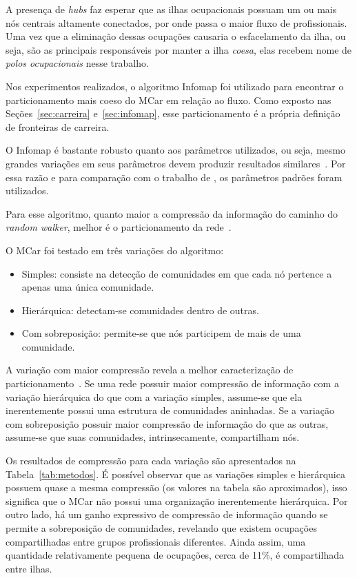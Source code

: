 \documentclass[
  article,
  11pt,
  a4paper,
  english,
  brazil,
  sumario=tradicional]{abntex2}
\begin{document}
A presença de \textit{hubs} faz esperar que as ilhas ocupacionais possuam um ou mais nós centrais altamente conectados, por onde passa o maior fluxo de profissionais. Uma vez que a eliminação dessas ocupações causaria o esfacelamento da ilha, ou seja, são as principais responsáveis por manter a ilha \textit{coesa}, elas recebem nome de \textit{polos ocupacionais} nesse trabalho.


Nos experimentos realizados, o algoritmo Infomap foi utilizado para encontrar o particionamento mais coeso do MCar em relação ao fluxo. Como exposto nas Seções~\ref{sec:carreira} e~\ref{sec:infomap}, esse particionamento é a própria definição de fronteiras de carreira.

O Infomap é bastante robusto quanto aos parâmetros utilizados, ou seja, mesmo grandes variações em seus parâmetros devem produzir resultados similares~\cite{Kawamoto2015-ha,Lambiotte2012-fp}. Por essa razão e para comparação com o trabalho de , os parâmetros padrões foram utilizados.

Para esse algoritmo, quanto maior a compressão da informação do caminho do \textit{random walker}, melhor é o particionamento da rede~\cite{Rosvall2009-sd}.

O MCar foi testado em três variações do algoritmo: 
\begin{itemize}
\item Simples: consiste na detecção de comunidades em que cada nó pertence a apenas uma única comunidade. 
\item Hierárquica: detectam-se comunidades dentro de outras. 
\item Com sobreposição: permite-se que nós participem de mais de uma comunidade.
\end{itemize}

A variação com maior compressão revela a melhor caracterização de particionamento~\cite{Viamontes_Esquivel2011-it,Rosvall2011-yi}. Se uma rede possuir maior compressão de informação com a variação hierárquica do que com a variação simples, assume-se que ela inerentemente possui uma estrutura de comunidades aninhadas. Se a variação com sobreposição possuir maior compressão de informação do que as outras, assume-se que suas comunidades, intrinsecamente, compartilham nós.

Os resultados de compressão para cada variação são apresentados na Tabela~\ref{tab:metodos}. É possível observar que as variações simples e hierárquica possuem quase a mesma compressão (os valores na tabela são aproximados), isso significa que o MCar não possui uma organização inerentemente hierárquica. Por outro lado, há um ganho expressivo de compressão de informação quando se permite a sobreposição de comunidades, revelando que existem ocupações compartilhadas entre grupos profissionais diferentes. Ainda assim, uma quantidade relativamente pequena de ocupações, cerca de 11\%, é compartilhada entre ilhas.
\end{document}
